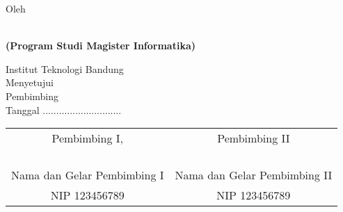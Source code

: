 \clearpage
\pagestyle{empty}

\begin{center}
\smallskip

    \singlespacing
    \large \bfseries \MakeUppercase{\thetitle}
    \vfill

    \normalsize \normalfont Oleh

    \bfseries \large \theauthor\\
    \normalsize (Program Studi Magister Informatika)

    \normalsize \normalfont Institut Teknologi Bandung \\

    \vfill
    \normalsize \normalfont
    Menyetujui\\
    Pembimbing\\
    \bigskip
    Tanggal .............................

    \vfill
    \setlength{\tabcolsep}{12pt}
    \begin{tabular}{c@{\hskip 0.5in}c}
        Pembimbing I, & Pembimbing II \\
        & \\
        & \\
        & \\
        & \\
        Nama dan Gelar Pembimbing I & Nama dan Gelar Pembimbing II \\
        NIP 123456789 & NIP 123456789 \\
    \end{tabular}

\end{center}
\clearpage
